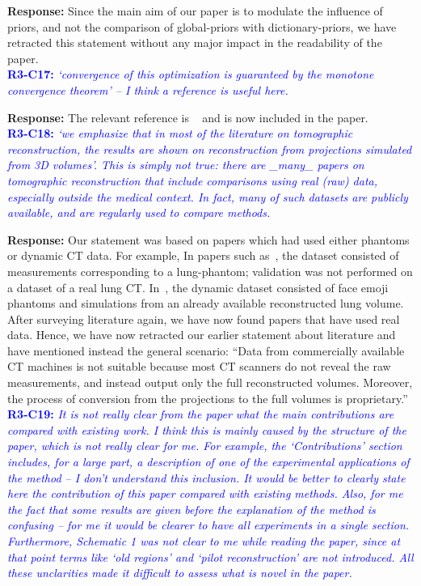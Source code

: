 \documentclass{article}
\begin{document}
\textbf{Response:} Since the main aim of our paper is to modulate the influence of priors, and not the comparison of global-priors with dictionary-priors, we have retracted this statement without any major impact in the readability of the paper. \\

\textcolor{blue}{\textbf{R3-C17:}\textit{ `convergence of this optimization is guaranteed by the monotone convergence theorem' -- I think a reference is useful here.}}

\textbf{Response:} The relevant reference is ~\cite{monotone} and is now included in the paper.\\

\textcolor{blue}{\textbf{R3-C18:}\textit{ `we emphasize that in most of the literature on tomographic reconstruction, the results are shown on reconstruction from projections simulated from 3D volumes'. This is simply not true: there are \_many\_ papers on tomographic reconstruction that include comparisons using real (raw) data, especially outside the medical context. In fact, many of such datasets are publicly available, and are regularly used to compare methods.}}

\textbf{Response:} Our statement was based on papers which had used either phantoms or dynamic CT data. For example, In papers such as~\cite{pirple}, the dataset consisted of measurements corresponding to a lung-phantom; validation was not performed on a dataset of a real lung CT. In~\cite{Hakka2019}, the dynamic dataset consisted of face emoji phantoms and simulations from an already available reconstructed lung volume. After surveying literature again, we have now found papers that have used real data. Hence,  we have now retracted our earlier statement about literature and have mentioned instead the general scenario: ``Data from commercially available CT machines is not suitable because most CT scanners do not reveal the raw measurements, and instead output only the full reconstructed volumes. Moreover, the process of conversion from the  projections to the full volumes is proprietary.'' \\

\textcolor{blue}{\textbf{R3-C19:}\textit{ It is not really clear from the paper what the main contributions are compared with existing work. I think this is mainly caused by the structure of the paper, which is not really clear for me. For example, the `Contributions' section includes, for a large part, a description of one of the experimental applications of the method -- I don't understand this inclusion. It would be better to clearly state here the contribution of this paper compared with existing methods. Also, for me the fact that some results are given before the explanation of the method is confusing -- for me it would be clearer to have all experiments in a single section. Furthermore, Schematic 1 was not clear to me while reading the paper, since at that point terms like `old regions' and `pilot reconstruction' are not introduced. All these unclarities made it difficult to assess what is novel in the paper.}}
\end{document}
